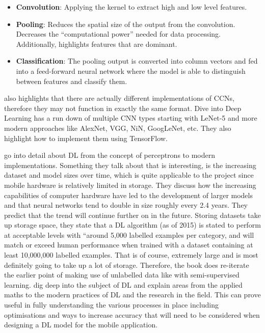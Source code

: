 \documentclass[12pt,a4paper]{report}
\begin{document}
\begin{itemize}
    \item \textbf{Convolution}: Applying the kernel to extract high and low level features.
    \item \textbf{Pooling}: Reduces the spatial size of the output from the convolution. Decreases the “computational power” 
    needed for data processing. Additionally, highlights features that are dominant.
    \item \textbf{Classification}: The pooling output is converted into column vectors and fed into a feed-forward neural 
    network where the model is able to distinguish between features and classify them.
\end{itemize}

\citet{saha2018} also highlights that there are actually different implementations of CCNs, therefore they may not function 
in exactly the same format. Dive into Deep Learning \citep{diveintodeeplearning} has a run down of multiple CNN types 
starting with LeNet-5 and more modern approaches like AlexNet, VGG, NiN, GoogLeNet, etc. They also highlight how to 
implement them using TensorFlow.

\par

\citet{goodfellow2016deep} go into detail about DL from the concept of perceptrons to modern 
implementations. Something they talk about that is interesting, is the increasing dataset and model sizes over time, 
which is quite applicable to the project since mobile hardware is relatively limited in storage. They discuss how the 
increasing capabilities of computer hardware have led to the development of larger models and that neural networks tend 
to double in size roughly every 2.4 years. They predict that the trend will continue further on in the future. Storing 
datasets take up storage space, they state that a DL algorithm 
(as of 2015) is stated to perform at acceptable levels with “around 5,000 labelled examples per category, and will match
or exceed human performance when trained with a dataset containing at least 10,000,000 labelled examples. That is of 
course, extremely large and is most definitely going to take up a lot of storage. Therefore, the book does re-iterate 
the earlier point of making use of unlabelled data like with semi-supervised learning. \citet{goodfellow2016deep} 
dig deep into the subject of DL and explain areas from the applied maths to the modern practices of DL and 
the research in the field. This can prove useful in fully understanding the various processes in place including 
optimisations and ways to increase accuracy that will need to be considered when designing a DL model for the mobile 
application.
\end{document}
